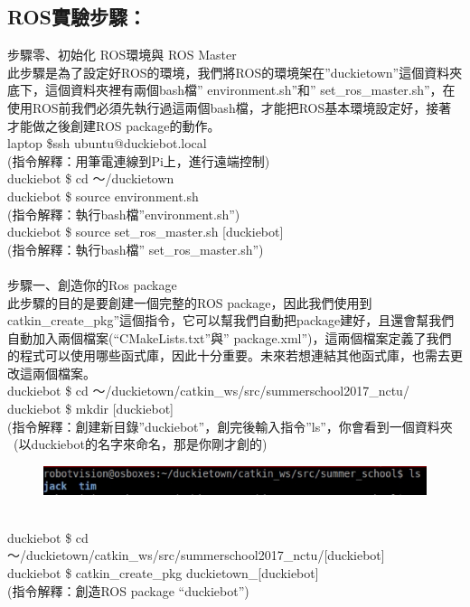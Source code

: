 \documentclass{article}
\begin{document}
\subsection{ROS實驗步驟：}
步驟零、初始化 ROS環境與 ROS Master
\\此步驟是為了設定好ROS的環境，我們將ROS的環境架在”duckietown”這個資料夾底下，這個資料夾裡有兩個bash檔” environment.sh”和” set\_ros\_master.sh”，在使用ROS前我們必須先執行過這兩個bash檔，才能把ROS基本環境設定好，接著才能做之後創建ROS package的動作。
\\laptop \$ssh ubuntu@duckiebot.local
\\(指令解釋：用筆電連線到Pi上，進行遠端控制)
\\duckiebot \$ cd ～/duckietown
\\duckiebot \$ source environment.sh
\\(指令解釋：執行bash檔”environment.sh”)
\\duckiebot \$ source set\_ros\_master.sh [duckiebot]
\\(指令解釋：執行bash檔” set\_ros\_master.sh”)
\\\\步驟一、創造你的Ros package 
\\此步驟的目的是要創建一個完整的ROS package，因此我們使用到catkin\_create\_pkg”這個指令，它可以幫我們自動把package建好，且還會幫我們自動加入兩個檔案(“CMakeLists.txt”與” package.xml”)，這兩個檔案定義了我們的程式可以使用哪些函式庫，因此十分重要。未來若想連結其他函式庫，也需去更改這兩個檔案。
\\duckiebot \$ cd ～/duckietown/catkin\_ws/src/summerschool2017\_nctu/
\\duckiebot \$ mkdir [duckiebot]
\\(指令解釋：創建新目錄”duckiebot”，創完後輸入指令”ls”，你會看到一個資料夾  (以duckiebot的名字來命名，那是你剛才創的)
\begin{figure}[htp]
    \begin{center}
        \includegraphics[width=400pt]{pic/5_2_1.png}
    \end{center}
\end{figure}
\\
duckiebot \$ cd ～/duckietown/catkin\_ws/src/summerschool2017\_nctu/[duckiebot]
\\duckiebot \$ catkin\_create\_pkg duckietown\_[duckiebot]
\\(指令解釋：創造ROS package “duckiebot”)
\end{document}
